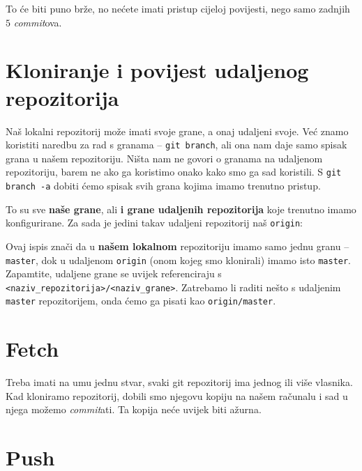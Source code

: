 
To će biti puno brže, no nećete imati pristup cijeloj povijesti, nego samo zadnjih $5$ \emph{commit}ova.

\section*{Kloniranje i povijest udaljenog repozitorija}

Naš lokalni repozitorij može imati svoje grane, a onaj udaljeni svoje.
Već znamo koristiti naredbu za rad s granama -- \verb+git branch+, ali ona nam daje samo spisak grana u našem repozitoriju.
Ništa nam ne govori o granama na udaljenom repozitoriju, barem ne ako ga koristimo onako kako smo ga sad koristili.
S \verb+git branch -a+ dobiti ćemo spisak svih grana kojima imamo trenutno pristup.

To su sve \textbf{naše grane}, ali \textbf{i grane udaljenih repozitorija} koje trenutno imamo konfigurirane.
Za sada je jedini takav udaljeni repozitorij naš \verb+origin+:



Ovaj ispis znači da u \textbf{našem lokalnom} repozitoriju imamo samo jednu granu -- \verb+master+, dok u udaljenom \verb+origin+ (onom kojeg smo klonirali) imamo isto \verb+master+.
Zapamtite, udaljene grane se uvijek referenciraju s \verb+<naziv_repozitorija>/<naziv_grane>+. 
Zatrebamo li raditi nešto s udaljenim \verb+master+ repozitorijem, onda ćemo ga pisati kao \verb+origin/master+.

%

\section*{Fetch}

Treba imati na umu jednu stvar, svaki git repozitorij ima jednog ili više vlasnika.
Kad kloniramo repozitorij, dobili smo njegovu kopiju na našem računalu i sad u njega možemo \emph{commit}ati.
Ta kopija neće uvijek biti ažurna.



\section*{Push}

